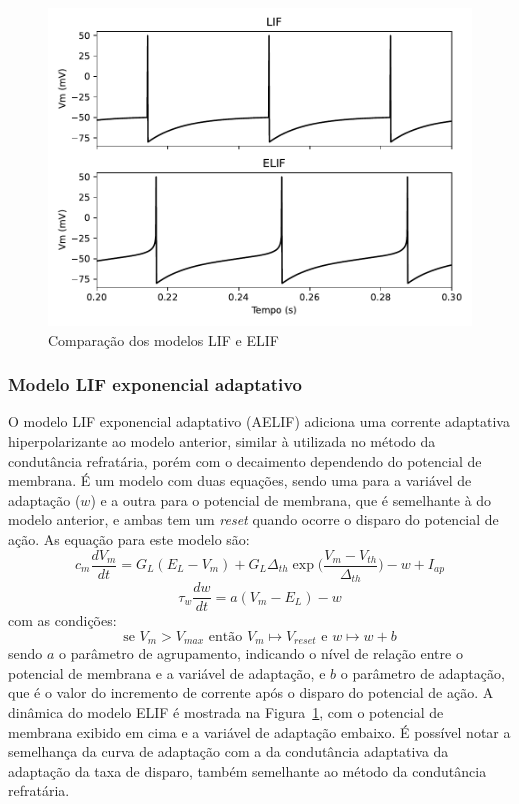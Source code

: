 \begin{figure}[tb]
	\centering
	\caption{Comparação dos modelos LIF e ELIF}
	\label{fig:elif}
	\includegraphics[width=0.7\linewidth]{figs/elif}
\end{figure}

\subsubsection{Modelo LIF exponencial adaptativo}
O modelo LIF exponencial adaptativo (AELIF) adiciona uma corrente adaptativa hiperpolarizante ao modelo anterior, similar à utilizada no método da condutância refratária, porém com o decaimento dependendo do potencial de membrana. É um modelo com duas equações, sendo uma para a variável de adaptação ($w$) e a outra para o potencial de membrana, que é semelhante à do modelo anterior, e ambas tem um \textit{reset} quando ocorre o disparo do potencial de ação.
As equação para este modelo são:
\begin{equation}
	c_m\frac{dV_m}{dt} = G_L(E_L-V_m) + G_L\Delta_{th}\exp\Big(\frac{V_m-V_{th}}{\Delta_{th}}\Big) - w + I_{ap}
\end{equation}
\begin{equation}
	\tau_w\frac{dw}{dt}=a(V_m-E_L)-w
\end{equation}
com as condições:
\begin{equation}
	\text{se } V_m > V_{max} \text{ então } V_m\mapsto V_{reset} \text{ e } w\mapsto w + b
\end{equation}
sendo $a$ o parâmetro de agrupamento, indicando o nível de relação entre o potencial de membrana e a variável de adaptação, e $b$ o parâmetro de adaptação, que é o valor do incremento de corrente após o disparo do potencial de ação. A dinâmica do modelo ELIF é mostrada na Figura~\ref{fig:elif}, com o potencial de membrana exibido em cima e a variável de adaptação embaixo. É possível notar a semelhança da curva de adaptação com a da condutância adaptativa da adaptação da taxa de disparo, também semelhante ao método da condutância refratária.

